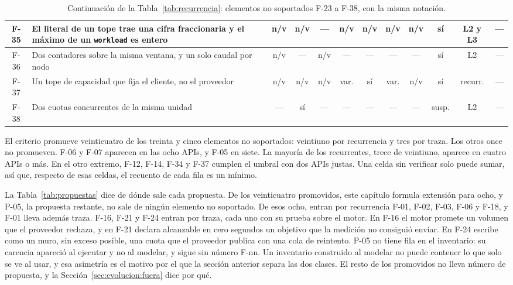 \begin{table}[H]
\begin{tabular}{|c|p{4.6cm}|c|c|c|c|c|c|c|c|c|c|}
\hline
F-35 & El literal de un tope trae una cifra fraccionaria y el máximo de un \texttt{workload} es entero & n/v & n/v & --- & n/v & n/v & n/v & n/v & sí & L2 y L3 & --- \\
\hline
F-36 & Dos contadores sobre la misma ventana, y un solo caudal por nodo & n/v & --- & n/v & --- & --- & --- & --- & sí & L2 & --- \\
\hline
F-37 & Un tope de capacidad que fija el cliente, no el proveedor & n/v & n/v & n/v & var. & sí & var. & n/v & sí & recurr. & --- \\
\hline
F-38 & Dos cuotas concurrentes de la misma unidad & --- & sí & --- & --- & --- & --- & --- & susp. & L2 & --- \\
\hline
\end{tabular}
\caption{Continuación de la Tabla~\ref{tab:recurrencia}: elementos no soportados F-23 a F-38, con la misma notación.}
\label{tab:recurrencia:b}
\end{table}

El criterio promueve veinticuatro de los treinta y cinco elementos no soportados: veintiuno por recurrencia y tres por traza.
Los otros once no promueven.
F-06 y F-07 aparecen en las ocho APIs, y F-05 en siete.
La mayoría de los recurrentes, trece de veintiuno, aparece en cuatro APIs o más.
En el otro extremo, F-12, F-14, F-34 y F-37 cumplen el umbral con dos APIs justas.
Una celda sin verificar solo puede sumar, así que, respecto de esas celdas, el recuento de cada fila es un mínimo.

La Tabla~\ref{tab:propuestas} dice de dónde sale cada propuesta.
De los veinticuatro promovidos, este capítulo formula extensión para ocho, y P-05, la propuesta restante, no sale de ningún elemento no soportado.
De esos ocho, entran por recurrencia F-01, F-02, F-03, F-06 y F-18, y F-01 lleva además traza.
F-16, F-21 y F-24 entran por traza, cada uno con su prueba sobre el motor.
En F-16 el motor promete un volumen que el proveedor rechaza, y en F-21 declara alcanzable en cero segundos un objetivo que la medición no consiguió enviar.
En F-24 escribe como un muro, sin exceso posible, una cuota que el proveedor publica con una cola de reintento.
P-05 no tiene fila en el inventario: su carencia apareció al ejecutar y no al modelar, y sigue sin número F-nn.
Un inventario construido al modelar no puede contener lo que solo se ve al usar, y esa asimetría es el motivo por el que la sección anterior separa las dos clases.
El resto de los promovidos no lleva número de propuesta, y la Sección~\ref{sec:evolucion:fuera} dice por qué.

